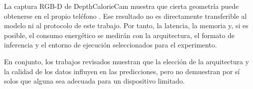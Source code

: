 La captura RGB-D de DepthCalorieCam muestra que cierta geometría puede obtenerse
en el propio teléfono \citep{andoDepthCalorieCamMobileApplication2019}. Ese
resultado no es directamente transferible al modelo ni al protocolo de este
trabajo. Por tanto, la latencia, la memoria y, si es posible, el consumo
energético se medirán con la arquitectura, el formato de inferencia y el
entorno de ejecución seleccionados para el experimento.

En conjunto, los trabajos revisados muestran que la elección de la arquitectura
y la calidad de los datos influyen en las predicciones, pero no demuestran por sí solos que alguna sea
adecuada para un dispositivo limitado.

